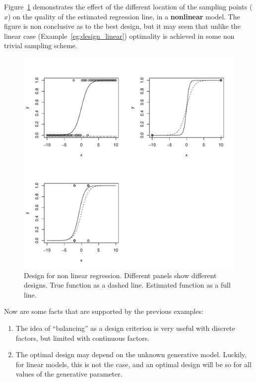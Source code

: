 \begin{example}
\label{eg:design_non_linear}
Figure~\ref{fig:design_nonlinear} demonstrates the effect of the different location of the sampling points ($x$) on the quality of the estimated regression line, in a \textbf{nonlinear} model.
The figure is non conclusive as to the best design, but it may seem that unlike the linear case (Example~\ref{eg:design_linear}) optimality is achieved in some non trivial sampling scheme.
\begin{figure}[ht]
\centering
\includegraphics[height=0.3\textheight]{art/nonlinear}
\caption[Design for Non Linear Models]{Design for non linear regression. Different panels show different designs. True function as a dashed line. Estimated function as a full line.}
\label{fig:design_nonlinear}
\end{figure}
\end{example}





Now are some facts that are supported by the previous examples:
\begin{enumerate}
\item The idea of ``balancing'' as a design criterion is very useful with discrete factors, but limited with continuous factors. 
\item The optimal design may depend on the unknown generative model. Luckily, for linear models, this is not the case, and an optimal design will be so for all values of the generative parameter.
\end{enumerate}



